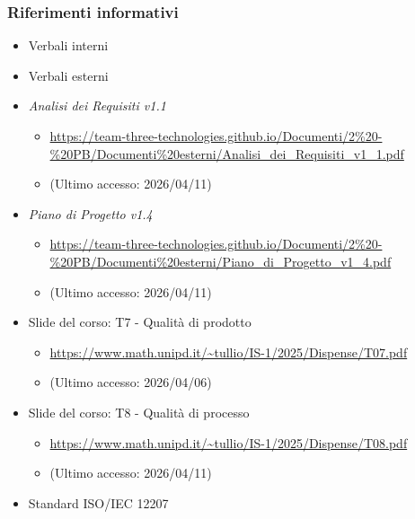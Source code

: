 \documentclass[a4paper,12pt]{article}
\begin{document}
{            \subsubsection{Riferimenti informativi}
                \begin{itemize}
                    \item Verbali interni
                    \item Verbali esterni
                    \item \textit{Analisi dei Requisiti v1.1}
                    \begin{itemize}
                        \item \url{https://team-three-technologies.github.io/Documenti/2%20-%20PB/Documenti%20esterni/Analisi_dei_Requisiti_v1_1.pdf}
                        \item[] (Ultimo accesso: 2026/04/11)
                    \end{itemize}
                    \item \textit{Piano di Progetto v1.4}
                    \begin{itemize}
                        \item \url{https://team-three-technologies.github.io/Documenti/2%20-%20PB/Documenti%20esterni/Piano_di_Progetto_v1_4.pdf}
                        \item[] (Ultimo accesso: 2026/04/11)
                    \end{itemize}
                    \item Slide del corso: T7 - Qualità di prodotto
                    \begin{itemize}
                        \item \url{https://www.math.unipd.it/~tullio/IS-1/2025/Dispense/T07.pdf}
                         \item[] (Ultimo accesso: 2026/04/06)
                    \end{itemize}
                    \item Slide del corso: T8 - Qualità di processo
                    \begin{itemize}
                        \item \url{https://www.math.unipd.it/~tullio/IS-1/2025/Dispense/T08.pdf}
                        \item[] (Ultimo accesso: 2026/04/11)
                    \end{itemize}
                    \item Standard ISO/IEC 12207

\end{itemize}}
\end{document}
